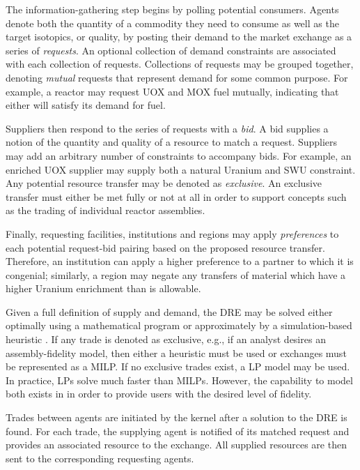 The information-gathering step begins by polling potential consumers. Agents
denote both the quantity of a commodity they need to consume as well as the
target isotopics, or quality, by posting their demand to the market exchange as
a series of \textit{requests}. An optional collection of demand constraints are
associated with each collection of requests. Collections of requests may be
grouped together, denoting \textit{mutual} requests that represent demand for
some common purpose. For example, a reactor may request \gls{UOX} and \gls{MOX} fuel
mutually, indicating that either will satisfy its demand for fuel.

Suppliers then respond to the series of requests with a \textit{bid}. A bid
supplies a notion of the quantity and quality of a resource to match a
request. Suppliers may add an arbitrary number of constraints to accompany
bids. For example, an enriched \gls{UOX} supplier may supply both a natural Uranium
and SWU constraint. Any potential resource transfer may be denoted as
\textit{exclusive}. An exclusive transfer must either be met fully or not at all
in order to support concepts such as the trading of individual reactor
assemblies.

Finally, requesting facilities, institutions and regions may apply
\textit{preferences} to each potential request-bid pairing based on the proposed
resource transfer. Therefore, an institution can apply a higher preference to a
partner to which it is congenial; similarly, a region may negate any transfers
of material which have a higher Uranium enrichment than is allowable.

Given a full definition of supply and demand, the \gls{DRE} may be solved either
optimally using a mathematical program or approximately by a simulation-based
heuristic \cite{Gidden2014}. If any trade is denoted as exclusive, e.g., if an
analyst desires an assembly-fidelity model, then either a heuristic must be used
or exchanges must be represented as a \gls{MILP}. If no exclusive trades exist,
a \gls{LP} model may be used. In practice, LPs solve much faster than
\gls{MILP}s. However, the capability to model both exists in \Cyclus in order to
provide users with the desired level of fidelity.

Trades between agents are initiated by the \Cyclus kernel after a solution to
the \gls{DRE} is found. For each trade, the supplying agent is notified of its
matched request and provides an associated resource to the exchange. All
supplied resources are then sent to the corresponding requesting agents.

